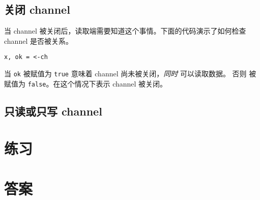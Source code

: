 \subsection{关闭 channel}
当 channel 被关闭后，读取端需要知道这个事情。下面的代码演示了如何检查 channel 是否被关系。
\begin{lstlisting}
x, ok = <-ch
\end{lstlisting}
当 \lstinline{ok} 被赋值为 \lstinline{true} 意味着 channel 尚未被关闭，\emph{同时} 可以读取数据。
否则  被赋值为 \lstinline{false}。在这个情况下表示 channel 被关闭。

\subsection{只读或只写 channel}



\section{练习}




\cleardoublepage
\section{答案}
\shipoutAnswer
